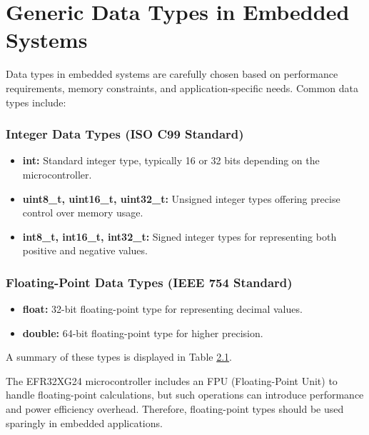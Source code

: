 \documentclass[
  9pt,
  letterpaper,
  abstract,
  titlepage]{scrbook}
\begin{document}
\section{Generic Data Types in Embedded
Systems}\label{generic-data-types-in-embedded-systems}

Data types in embedded systems are carefully chosen based on performance
requirements, memory constraints, and application-specific needs. Common
data types include:

\subsubsection{Integer Data Types (ISO C99
Standard)}\label{integer-data-types-iso-c99-standard}

\begin{itemize}
\item
  \textbf{int:} Standard integer type, typically 16 or 32 bits depending
  on the microcontroller.
\item
  \textbf{uint8\_t, uint16\_t, uint32\_t:} Unsigned integer types
  offering precise control over memory usage.
\item
  \textbf{int8\_t, int16\_t, int32\_t:} Signed integer types for
  representing both positive and negative values.
\end{itemize}

\subsubsection{Floating-Point Data Types (IEEE 754
Standard)}\label{floating-point-data-types-ieee-754-standard}

\begin{itemize}
\item
  \textbf{float:} 32-bit floating-point type for representing decimal
  values.
\item
  \textbf{double:} 64-bit floating-point type for higher precision.
\end{itemize}

A summary of these types is displayed in Table
\hyperref[tab:integersizes]{2.1}.

The EFR32XG24 microcontroller includes an FPU (Floating-Point Unit) to
handle floating-point calculations, but such operations can introduce
performance and power efficiency overhead. Therefore, floating-point
types should be used sparingly in embedded applications.
\end{document}
